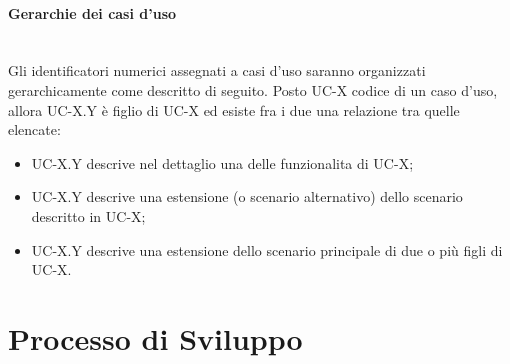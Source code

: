 \documentclass[11pt,a4paper]{article}
\begin{document}
\paragraph{Gerarchie dei casi d'uso} 
\noindent \\
 Gli identificatori numerici assegnati a casi d'uso saranno organizzati gerarchicamente come descritto di seguito. Posto UC-X codice di un caso d'uso, allora UC-X.Y è figlio di UC-X ed esiste fra i due una relazione tra quelle elencate:
\begin{itemize}
\item UC-X.Y descrive nel dettaglio una delle funzionalita di UC-X;
\item UC-X.Y descrive una estensione (o scenario alternativo) dello scenario descritto in UC-X; 
\item UC-X.Y descrive una estensione dello scenario principale di due o più figli di UC-X.
\end{itemize}
\newpage
	
	\section{Processo di Sviluppo}
\end{document}
